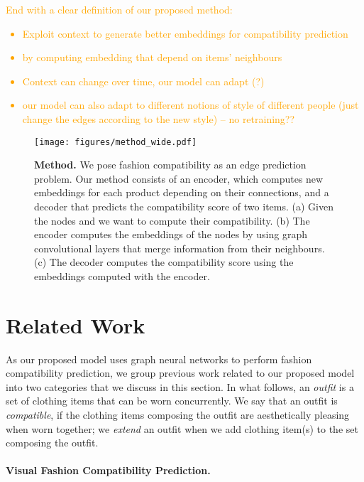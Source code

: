 \documentclass[10pt,twocolumn,letterpaper]{article}
\begin{document}
\textcolor{orange}{End with a clear definition of our proposed method:
\begin{itemize}
    \itemsep0em 
    \item Exploit context to generate better embeddings for compatibility prediction
    \item by computing embedding that depend on items' neighbours
    \item Context can change over time, our model can adapt (?)
    \item our model can also adapt to different notions of style of different people (just change the edges according to the new style) -- no retraining??
\end{itemize}
}
\fi

\begin{figure*}[t]
\begin{center}
\texttt{[image: figures/method\_wide.pdf]}
\end{center}
\caption{\textbf{Method.} We pose fashion compatibility as an edge prediction problem. Our method consists of an encoder, which computes new embeddings for each product depending on their connections, and a decoder that predicts the compatibility score of two items. (a) Given the nodes  and  we want to compute their compatibility. (b) The encoder computes the embeddings of the nodes by using  graph convolutional layers that merge information from their neighbours. (c) The decoder computes the compatibility score using the embeddings computed with the encoder.}
\label{fig:model}
\end{figure*}



\section{Related Work}
\label{sec:related_work}

As our proposed model uses graph neural networks to perform fashion compatibility prediction,
we group previous work related to our proposed model into two categories that we discuss in this section. 
In what follows, an \emph{outfit} is a set of clothing items that can be worn concurrently.
We say that an outfit is \emph{compatible}, if the clothing items composing the outfit are aesthetically pleasing when worn together;
we \emph{extend} an outfit when we add clothing item(s) to the set composing the outfit. 

\paragraph{Visual Fashion Compatibility Prediction.} 
\end{document}

